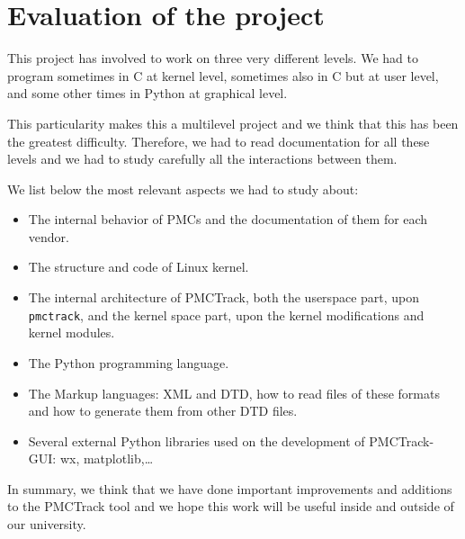 \section{Evaluation of the project}

This project has involved to work on three very different levels. We had to program sometimes in C at kernel level, sometimes also in C but at user level, and some other times in Python at graphical level.

This particularity makes this a multilevel project and we think that this has been the greatest difficulty. Therefore, we had to read documentation for all these levels and we had to study carefully all the interactions between them.

We list below the most relevant aspects we had to study about:
\begin{itemize}
  \item The internal behavior of PMCs and the documentation of them for each vendor.
  \item The structure and code of Linux kernel.
  \item The internal architecture of PMCTrack, both the userspace part, upon \texttt{pmctrack}, and the kernel space part, upon the kernel modifications and kernel modules.
  \item The Python programming language.
  \item The Markup languages: XML and DTD, how to read files of these formats and how to generate them from other DTD files.
  \item Several external Python libraries used on the development of PMCTrack-GUI: wx, matplotlib,\ldots
\end{itemize}

In summary, we think that we have done important improvements and additions to the PMCTrack tool and we hope this work will be useful inside and outside of our university.

